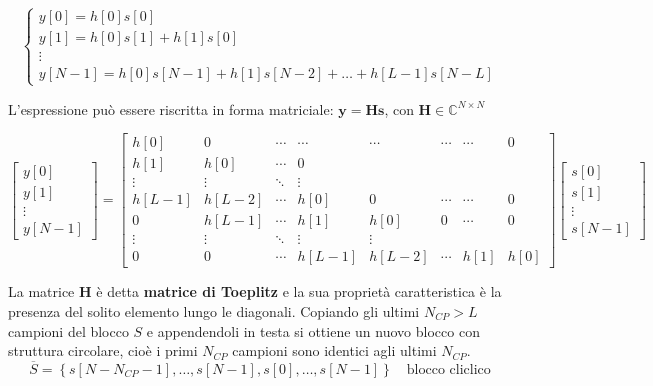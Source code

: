 
\[
    \begin{cases}
        y[0] = h[0]s[0] \\
        y[1] = h[0]s[1] + h[1]s[0] \\
        \vdots \\
        y[N-1] = h[0]s[N-1] + h[1]s[N-2] + \ldots + h[L-1]s[N-L]
    \end{cases}
\]



L'espressione può essere riscritta in forma matriciale: $\mathbf{y} = \mathbf{H} \mathbf{s}$, con $\mathbf{H} \in \mathbb{C}^{N \times N}$ 

\[ 
\begin{bmatrix} y[0] \\ y[1] \\ \vdots \\ y[N-1] \end{bmatrix} 
= 
\begin{bmatrix}
    h[0] & 0 & \cdots & \cdots & \cdots & \cdots & \cdots & 0 \\
    h[1] & h[0] & \cdots & 0 \\
    \vdots & \vdots & \ddots & \vdots \\
    h[L-1] & h[L-2] & \cdots & h[0] & 0 & \cdots & \cdots & 0 \\
    0 & h[L-1] & \cdots & h[1] & h[0] & 0 & \cdots & 0 \\
    \vdots & \vdots & \ddots & \vdots & \vdots \\
    0 & 0 & \cdots & h[L-1] & h[L-2] & \cdots & h[1] & h[0]
\end{bmatrix}   
\begin{bmatrix} s[0] \\ s[1] \\ \vdots \\ s[N-1] \end{bmatrix}
\]

La matrice $\mathbf{H}$ è detta \textbf{matrice di Toeplitz} e la sua proprietà caratteristica è la presenza del solito elemento lungo le diagonali. Copiando gli ultimi $N_{CP} > L$ campioni del blocco $S$ e appendendoli in testa si ottiene un nuovo blocco con struttura circolare, cioè i primi $N_{CP}$ campioni sono identici agli ultimi $N_{CP}$.
\[
    \overline{S} = \left\{s\left[N - N_{CP} - 1\right], \ldots, s\left[N - 1\right], s\left[0\right], \ldots, s\left[N - 1\right]\right\} \quad \text{blocco cliclico}
\]

